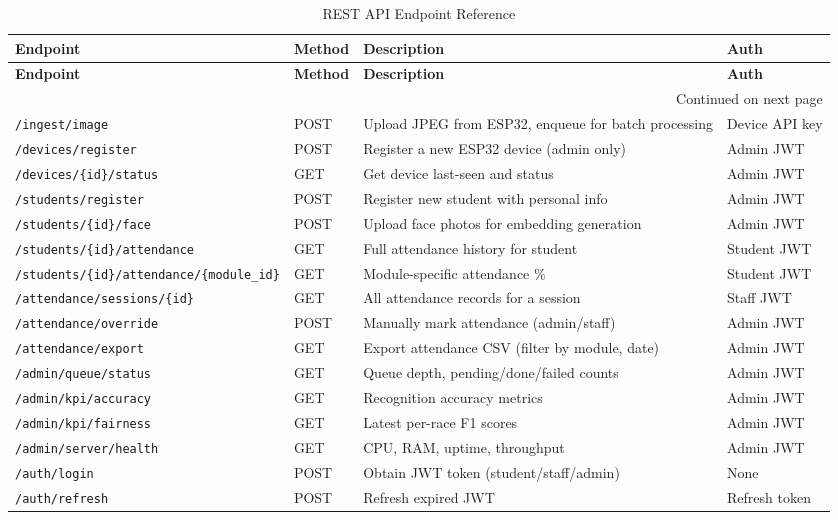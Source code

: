\documentclass[12pt,a4paper]{report}
\begin{document}
\begin{longtable}{p{4cm}p{1.5cm}p{4cm}p{5.5cm}}
\caption{REST API Endpoint Reference}\label{tab:api}\\
\toprule
\textbf{Endpoint} & \textbf{Method} & \textbf{Description} & \textbf{Auth} \\
\midrule
\endfirsthead
\toprule
\textbf{Endpoint} & \textbf{Method} & \textbf{Description} & \textbf{Auth} \\
\midrule
\endhead
\midrule
\multicolumn{4}{r}{\footnotesize Continued on next page}\\
\endfoot
\bottomrule
\endlastfoot

\texttt{/ingest/image}      & POST   & Upload JPEG from ESP32, enqueue for batch processing & Device API key \\
\texttt{/devices/register}  & POST   & Register a new ESP32 device (admin only) & Admin JWT \\
\texttt{/devices/\{id\}/status} & GET & Get device last-seen and status & Admin JWT \\
\midrule
\texttt{/students/register}    & POST   & Register new student with personal info & Admin JWT \\
\texttt{/students/\{id\}/face} & POST   & Upload face photos for embedding generation & Admin JWT \\
\texttt{/students/\{id\}/attendance} & GET & Full attendance history for student & Student JWT \\
\texttt{/students/\{id\}/attendance/\{module\_id\}} & GET & Module-specific attendance \% & Student JWT \\
\midrule
\texttt{/attendance/sessions/\{id\}} & GET & All attendance records for a session & Staff JWT \\
\texttt{/attendance/override}        & POST & Manually mark attendance (admin/staff) & Admin JWT \\
\texttt{/attendance/export}          & GET  & Export attendance CSV (filter by module, date) & Admin JWT \\
\midrule
\texttt{/admin/queue/status}     & GET  & Queue depth, pending/done/failed counts & Admin JWT \\
\texttt{/admin/kpi/accuracy}     & GET  & Recognition accuracy metrics & Admin JWT \\
\texttt{/admin/kpi/fairness}     & GET  & Latest per-race F1 scores & Admin JWT \\
\texttt{/admin/server/health}    & GET  & CPU, RAM, uptime, throughput & Admin JWT \\
\midrule
\texttt{/auth/login}    & POST & Obtain JWT token (student/staff/admin) & None \\
\texttt{/auth/refresh}  & POST & Refresh expired JWT & Refresh token \\
\end{longtable}
\end{document}
